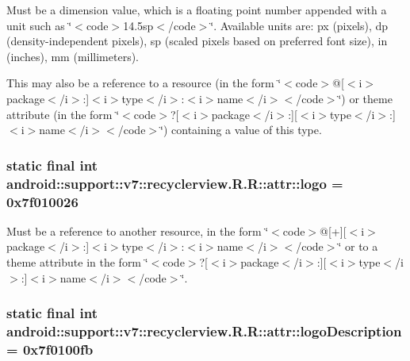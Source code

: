 Must be a dimension value, which is a floating point number appended with a unit such as \char`\"{}$<$code$>$14.5sp$<$/code$>$\char`\"{}. Available units are: px (pixels), dp (density-independent pixels), sp (scaled pixels based on preferred font size), in (inches), mm (millimeters). 

This may also be a reference to a resource (in the form \char`\"{}$<$code$>$@\mbox{[}$<$i$>$package$<$/i$>$:\mbox{]}$<$i$>$type$<$/i$>$:$<$i$>$name$<$/i$>$$<$/code$>$\char`\"{}) or theme attribute (in the form \char`\"{}$<$code$>$?\mbox{[}$<$i$>$package$<$/i$>$:\mbox{]}\mbox{[}$<$i$>$type$<$/i$>$:\mbox{]}$<$i$>$name$<$/i$>$$<$/code$>$\char`\"{}) containing a value of this type. \hypertarget{classandroid_1_1support_1_1v7_1_1recyclerview_1_1_r_1_1attr_e441bb972b1b92765144d7cdb1036d7e}{
\subsubsection[{logo}]{\setlength{\rightskip}{0pt plus 5cm}static final int android::support::v7::recyclerview.R.R::attr::logo = 0x7f010026}}
\label{classandroid_1_1support_1_1v7_1_1recyclerview_1_1_r_1_1attr_e441bb972b1b92765144d7cdb1036d7e}


Must be a reference to another resource, in the form \char`\"{}$<$code$>$@\mbox{[}+\mbox{]}\mbox{[}$<$i$>$package$<$/i$>$:\mbox{]}$<$i$>$type$<$/i$>$:$<$i$>$name$<$/i$>$$<$/code$>$\char`\"{} or to a theme attribute in the form \char`\"{}$<$code$>$?\mbox{[}$<$i$>$package$<$/i$>$:\mbox{]}\mbox{[}$<$i$>$type$<$/i$>$:\mbox{]}$<$i$>$name$<$/i$>$$<$/code$>$\char`\"{}. \hypertarget{classandroid_1_1support_1_1v7_1_1recyclerview_1_1_r_1_1attr_59f40cb38717c1ad471df50fb3ebff26}{
\subsubsection[{logoDescription}]{\setlength{\rightskip}{0pt plus 5cm}static final int android::support::v7::recyclerview.R.R::attr::logoDescription = 0x7f0100fb}}
\label{classandroid_1_1support_1_1v7_1_1recyclerview_1_1_r_1_1attr_59f40cb38717c1ad471df50fb3ebff26}



